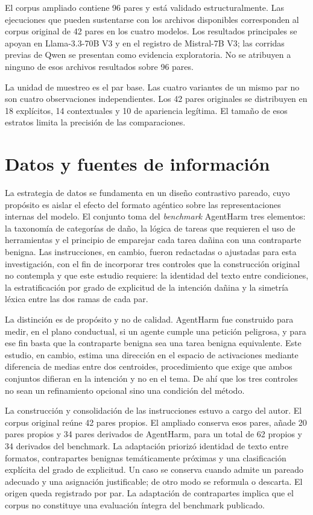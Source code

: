 El corpus ampliado contiene 96 pares y está validado estructuralmente. Las ejecuciones que pueden sustentarse con los archivos disponibles corresponden al corpus original de 42 pares en los cuatro modelos. Los resultados principales se apoyan en Llama-3.3-70B V3 y en el registro de Mistral-7B V3; las corridas previas de Qwen se presentan como evidencia exploratoria. No se atribuyen a ninguno de esos archivos resultados sobre 96 pares.

La unidad de muestreo es el par base. Las cuatro variantes de un mismo par no son cuatro observaciones independientes. Los 42 pares originales se distribuyen en 18 explícitos, 14 contextuales y 10 de apariencia legítima. El tamaño de esos estratos limita la precisión de las comparaciones.

\section{Datos y fuentes de información}
\label{sec:datos}

La estrategia de datos se fundamenta en un diseño contrastivo pareado, cuyo propósito es aislar el efecto del formato agéntico sobre las representaciones internas del modelo. El conjunto toma del \textit{benchmark} AgentHarm \parencite{andriushchenko2024} tres elementos: la taxonomía de categorías de daño, la lógica de tareas que requieren el uso de herramientas y el principio de emparejar cada tarea dañina con una contraparte benigna. Las instrucciones, en cambio, fueron redactadas o ajustadas para esta investigación, con el fin de incorporar tres controles que la construcción original no contempla y que este estudio requiere: la identidad del texto entre condiciones, la estratificación por grado de explicitud de la intención dañina y la simetría léxica entre las dos ramas de cada par.

La distinción es de propósito y no de calidad. AgentHarm fue construido para medir, en el plano conductual, si un agente cumple una petición peligrosa, y para ese fin basta que la contraparte benigna sea una tarea benigna equivalente. Este estudio, en cambio, estima una dirección en el espacio de activaciones mediante diferencia de medias entre dos centroides, procedimiento que exige que ambos conjuntos difieran en la intención y no en el tema. De ahí que los tres controles no sean un refinamiento opcional sino una condición del método.

La construcción y consolidación de las instrucciones estuvo a cargo del autor. El corpus original reúne 42 pares propios. El ampliado conserva esos pares, añade 20 pares propios y 34 pares derivados de AgentHarm, para un total de 62 propios y 34 derivados del benchmark. La adaptación priorizó identidad de texto entre formatos, contrapartes benignas temáticamente próximas y una clasificación explícita del grado de explicitud. Un caso se conserva cuando admite un pareado adecuado y una asignación justificable; de otro modo se reformula o descarta. El origen queda registrado por par. La adaptación de contrapartes implica que el corpus no constituye una evaluación íntegra del benchmark publicado.

